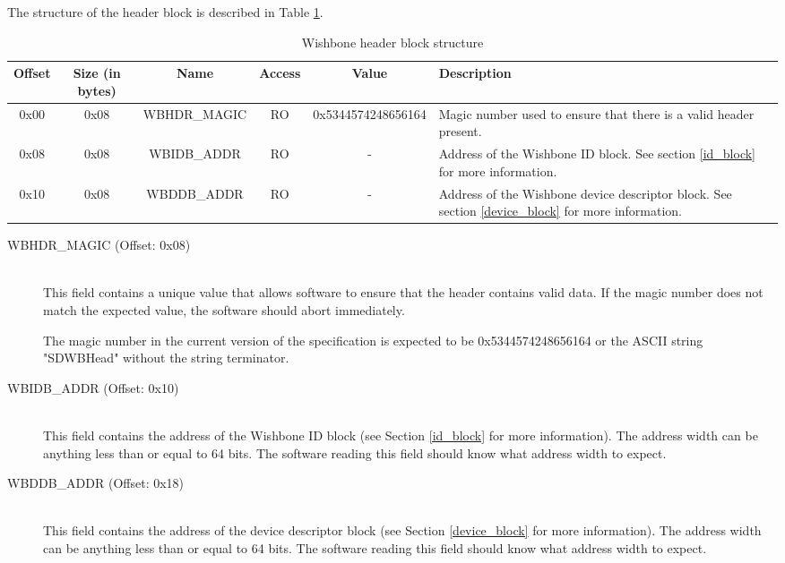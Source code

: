 \documentclass{article}
\begin{document}
The structure of the header block is described in Table \ref{hdr_block_struct}.

\begin{center}
	\begin{savenotes}
	\begin{table}[!ht]\footnotesize
	\caption{Wishbone header block structure}\label{hdr_block_struct}\centering
	\begin{tabular}{| c | c | c | c | c | p{5cm} |} \hline
	Offset & Size (in bytes) & Name & Access & Value & Description \\ \hline
	0x00 & 0x08 & WBHDR\_MAGIC & RO & 0x5344574248656164 & Magic number used to ensure that there is a valid header present. \\ \hline
	0x08 & 0x08 & WBIDB\_ADDR & RO & - & Address of the Wishbone ID block. See section \ref{id_block} for more information. \\ \hline
	0x10 & 0x08 & WBDDB\_ADDR & RO & - & Address of the Wishbone device descriptor block. See section \ref{device_block} for more information. \\ \hline
	\end{tabular}
	\end{table}
	\end{savenotes}
\end{center}

\begin{description}
\item[WBHDR\_MAGIC (Offset: 0x08)] \hfill \\
This field contains a unique value that allows software to ensure that
the header contains valid data. If the magic number does not match the
expected value, the software should abort immediately.

The magic number in the current version of the specification is expected to
be 0x5344574248656164 or the ASCII string "SDWBHead" without the string
terminator.

\item[WBIDB\_ADDR (Offset: 0x10)] \hfill \\
This field contains the address of the Wishbone ID block (see Section \ref{id_block}
for more information). The address width can be anything less than or equal
to 64 bits. The software reading this field should know what address width to
expect.

\item[WBDDB\_ADDR (Offset: 0x18)] \hfill \\
This field contains the address of the device descriptor block (see Section
\ref{device_block} for more information). The address width can be anything
less than or equal to 64 bits. The software reading this field should know
what address width to expect.
\end{description}
\end{document}
